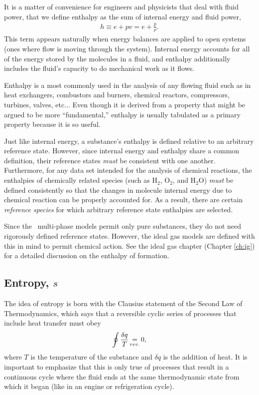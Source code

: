 It is a matter of convenience for engineers and physicists that deal with fluid power, that we define enthalpy as the sum of internal energy and fluid power,
\begin{align}
h \equiv e + pv = e + \frac{p}{\rho}.
\end{align}
This term appears naturally when energy balances are applied to open systems (ones where flow is moving through the system).  Internal energy accounts for all of the energy stored by the molecules in a fluid, and enthalpy additionally includes the fluid's capacity to do mechanical work as it flows.

Enthalpy is a most commonly used in the analysis of any flowing fluid such as in heat exchangers, combustors and burners, chemical reactors, compressors, turbines, valves, etc...  Even though it is derived from a property that might be argued to be more ``fundamental,'' enthalpy is usually tabulated as a primary property because it is so useful.

Just like internal energy, a substance's enthalpy is defined relative to an arbitrary reference state.  However, since internal energy and enthalpy share a common definition, their reference states \emph{must} be consistent with one another.  Furthermore, for any data set intended for the analysis of chemical reactions, the enthalpies of chemically related species (such as H$_2$, O$_2$, and H$_2$O) \emph{must} be defined consistently so that the changes in molecule internal energy due to chemical reaction can be properly accounted for.  As a result, there are certain \emph{reference species} for which arbitrary reference state enthalpies are selected.  

Since the \PM\ multi-phase models permit only pure substances, they do not need rigorously defined reference states.  However, the ideal gas models are defined with this in mind to permit chemical action.  See the ideal gas chapter (Chapter \ref{ch:ig}) for a detailed discussion on the enthalpy of formation.

\subsection{Entropy, $s$}\label{sec:intro:s}

The idea of entropy is born with the Clausius statement of the Second Law of Thermodynamics, which says that a reversible cyclic series of processes that include heat transfer must obey
\begin{align}
\oint \frac{\delta q}{T} \operatorname*{=}_{rev.} 0,
\end{align}
where $T$ is the temperature of the substance and $\delta q$ is the addition of heat.  It is important to emphasize that this is only true of processes that result in a continuous cycle where the fluid ends at the same thermodynamic state from which it began (like in an engine or refrigeration cycle).

